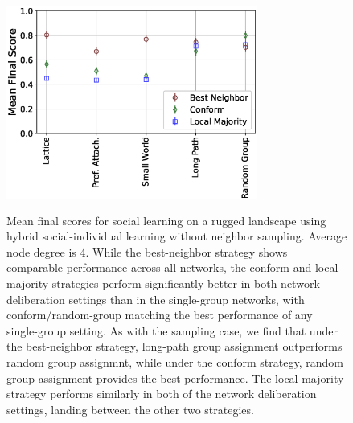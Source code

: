 \begin{figure}
    \centering
    \includegraphics[width=3.25in,height=2.75in]{fig-performance-nosample.eps}
    \caption{Mean final scores for social learning on a rugged landscape using hybrid social-individual learning without neighbor sampling. Average node degree is 4. While the best-neighbor strategy shows comparable performance across all networks, the conform and local majority strategies perform significantly better in both network deliberation settings than in the single-group networks, with conform/random-group matching the best performance of any single-group setting. As with the sampling case, we find that under the best-neighbor strategy, long-path group assignment outperforms random group assignmnt, while under the conform strategy, random group assignment provides the best performance. The local-majority strategy performs similarly in both of the network deliberation settings, landing between the other two strategies.}
    \label{fig:result-nosample}
\end{figure}

